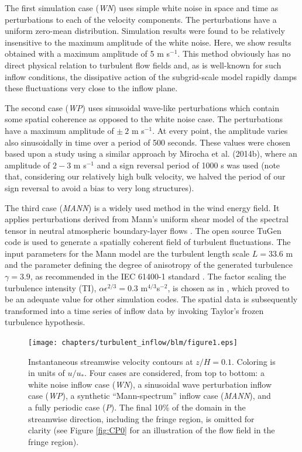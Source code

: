 	The first simulation case (\emph{WN}) uses simple white noise in space and time as perturbations to each of the velocity components.  The perturbations have a uniform zero-mean distribution. Simulation results were found to be relatively insensitive to the maximum amplitude of the white noise. Here, we show results obtained with a maximum amplitude of 5 m s$^{-1}$. This method obviously has no direct physical relation to turbulent flow fields and, as is well-known for such inflow conditions, the dissipative action of the subgrid-scale model rapidly damps these fluctuations very close to the inflow plane. 
	
	The second case (\emph{WP}) uses sinusoidal wave-like perturbations which contain some spatial coherence as opposed to the white noise case. The perturbations have a maximum amplitude of $\pm~2$ m s$^{-1}$. At every point, the amplitude varies also sinusoidally in time over a period of 500 seconds. These values were chosen based upon a study using a similar approach by Mirocha et al. (2014b), where an amplitude of $2-3$ m s$^{-1}$ and a sign reversal period of 1000 s was used (note that, considering our relatively high bulk velocity, we halved the period of our sign reversal to avoid a bias to very long structures). 
	
	The third case (\emph{MANN}) is a widely used method in the wind energy field. It applies perturbations derived from Mann's uniform shear
	model of the spectral tensor in neutral atmospheric boundary-layer flows \citep{mann1998wind}. The open source TuGen code
	\citep{gilling2009tugen} is used to generate a spatially coherent field of turbulent fluctuations. The input parameters for the Mann model are
	the turbulent length scale $L = 33.6$ m and the parameter defining the degree of anisotropy of the generated turbulence $\gamma = 3.9$, as
	recommended in the IEC 61400-1 standard \citep{IEC61400-1}. The factor scaling the turbulence intensity (TI), $\alpha \epsilon^{2/3} = 0.3$ m$^{4/3}$s$^{-2}$, is chosen as in \cite{van2014cfd}, which proved to be an adequate value for other simulation codes. The spatial data is subsequently transformed into a time series of inflow data by invoking Taylor's frozen turbulence hypothesis.
	
	\begin{figure}[ht!]
		\centering
		\texttt{[image: chapters/turbulent\_inflow/blm/figure1.eps]}
		\caption[Instantaneous streamwise velocity contours at $z/H = 0.1$.]{Instantaneous streamwise velocity contours at $z/H = 0.1$. Coloring is in units of $u/u_*$.  Four cases are considered, from top to bottom: a white noise inflow case (\emph{WN}), a sinusoidal wave perturbation inflow case (\emph{WP}), a synthetic ``Mann-spectrum'' inflow case (\emph{MANN}), and a fully periodic case (\emph{P}). The final 10\% of the domain in the streamwise direction, including the fringe region, is omitted for clarity (see Figure \ref{fig:CP0} for an illustration of the flow field in the fringe region).}
		\label{fig:snapshots_top}
	\end{figure}
	
